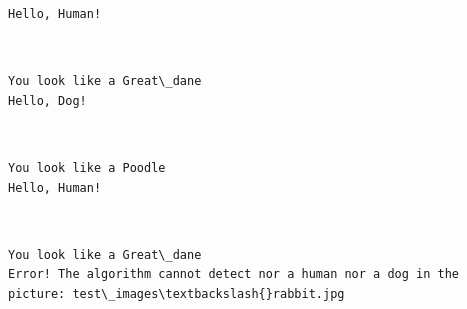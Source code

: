 \documentclass[11pt]{article}
\begin{document}
    \begin{Verbatim}[commandchars=\\\{\}]
Hello, Human!

    \end{Verbatim}

    \begin{center}
    \end{center}
    { \hspace*{\fill} \\}
    
    \begin{Verbatim}[commandchars=\\\{\}]
You look like a Great\_dane
Hello, Dog!

    \end{Verbatim}

    \begin{center}
    \end{center}
    { \hspace*{\fill} \\}
    
    \begin{Verbatim}[commandchars=\\\{\}]
You look like a Poodle
Hello, Human!

    \end{Verbatim}

    \begin{center}
    \end{center}
    { \hspace*{\fill} \\}
    
    \begin{Verbatim}[commandchars=\\\{\}]
You look like a Great\_dane
Error! The algorithm cannot detect nor a human nor a dog in the picture: test\_images\textbackslash{}rabbit.jpg

    \end{Verbatim}

    \begin{center}
    \end{center}
    { \hspace*{\fill} \\}
    
\end{document}
